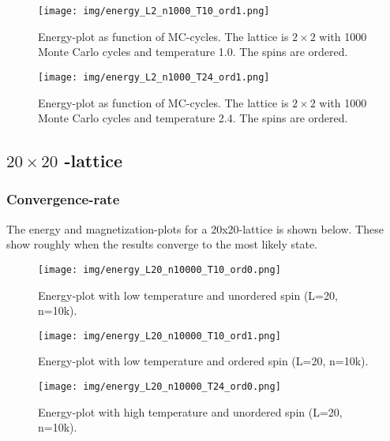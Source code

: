 \documentclass{article}
\begin{document}
  \begin{figure}[ht]
      \centering
      \texttt{[image: img/energy\_L2\_n1000\_T10\_ord1.png]}
      \caption{Energy-plot as function of MC-cycles. The lattice is $2 \times 2$ with 1000 Monte Carlo cycles and temperature 1.0. The spins are ordered. }
      \label{fig:energy_L2_n1000_T1.0_ord1}
    \end{figure}

  \begin{figure}[ht]
      \centering
      \texttt{[image: img/energy\_L2\_n1000\_T24\_ord1.png]}
      \caption{Energy-plot as function of MC-cycles. The lattice is $2 \times 2$ with 1000 Monte Carlo cycles and temperature 2.4. The spins are ordered. }
      \label{fig:energy_L2_n1000_T2.4_ord1}
    \end{figure}

\subsection{\texorpdfstring{ $20 \times 20$ }{text}-lattice} \label{sec:20x20lattice}

\subsubsection{Convergence-rate} \label{sec:convergence}

The energy and magnetization-plots for a 20x20-lattice is shown below. These show roughly when the results converge to the most likely state. \\


    \begin{figure}[ht]
      \centering
      \texttt{[image: img/energy\_L20\_n10000\_T10\_ord0.png]}
      \caption{Energy-plot with low temperature and unordered spin (L=20, n=10k).}
      \label{fig:L20-energy-lowT-ord0}
    \end{figure}

    \begin{figure}[ht]
      \centering
      \texttt{[image: img/energy\_L20\_n10000\_T10\_ord1.png]}
      \caption{Energy-plot with low temperature and ordered spin (L=20, n=10k).}
      \label{fig:L20-energy-lowT-ord1}
    \end{figure}

    \begin{figure}[ht]
      \centering
      \texttt{[image: img/energy\_L20\_n10000\_T24\_ord0.png]}
      \caption{Energy-plot with high temperature and unordered spin (L=20, n=10k).}
      \label{fig:L20-energy-highT-ord0}
    \end{figure}
\end{document}
